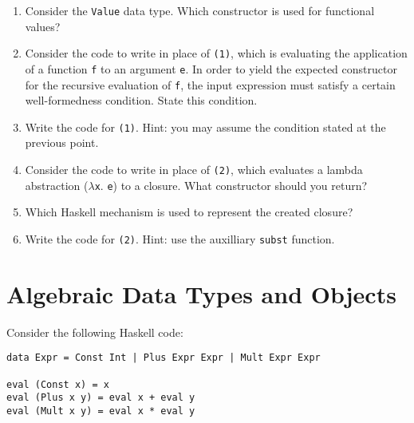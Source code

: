 \documentclass{article}
\newcommand{\answer}[1]{}
\begin{document}
\begin{enumerate}
\item Consider the \texttt{Value} data type. Which constructor is used
  for functional values? 

\item Consider the code to write in place of \texttt{(1)}, which is
  evaluating the application of a function \texttt{f} to an argument
  \texttt{e}. In order to yield the expected constructor for the recursive
  evaluation of \texttt{f}, the input expression must satisfy a certain well-formedness condition.
  State this condition. 

\item Write the code for \texttt{(1)}. Hint: you may assume the condition
  stated at the previous point. 

\item Consider the code to write in place of \texttt{(2)}, which
  evaluates a lambda abstraction ($\lambda$\texttt{x}. \texttt{e}) to a closure. What constructor
  should you return? 

\item Which Haskell mechanism is used to represent the created
  closure? 

\item Write the code for \texttt{(2)}. Hint: use the auxilliary
  \texttt{subst} function. 

\end{enumerate}

\answer{
\begin{enumerate}
\item Fun
\item Input program well-typed
\item \texttt{let Fun f' = eval f in f' (eval e)}
\item Fun
\item a Haskell function (or a Haskell closure). We depend on the
  underlying host language mechanism to evaluate functions.
\item \texttt{Fun (\v -> eval (subst x v e))}
\end{enumerate}
}

\newpage
\section{Algebraic Data Types and Objects}
Consider the following Haskell code:
\begin{verbatim}
data Expr = Const Int | Plus Expr Expr | Mult Expr Expr

eval (Const x) = x
eval (Plus x y) = eval x + eval y
eval (Mult x y) = eval x * eval y
\end{verbatim}
\end{document}
